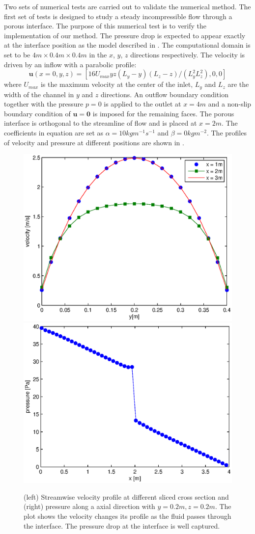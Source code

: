 Two sets of numerical tests are carried out to validate the numerical method.
The first set of tests is designed to study a steady incompressible flow
through a porous interface. The purpose of this numerical test is to verify the
implementation of our method. The pressure drop is expected to appear exactly
at the interface position as the model described in .  The
computational domain is set to be $4m\times 0.4m\times 0.4m$ in the $x$, $y$,
$z$ directions respectively. The velocity is driven by an inflow with a
parabolic profile:
\begin{equation}
\mathbf{u}(x=0,y,z) = [16U_{max}yz(L_y - y)(L_z - z)/(L^2_yL^2_z),0,0]
\end{equation}
where $U_{max}$ is the maximum velocity at the center of the inlet, $L_y$ and
$L_z$ are the width of the channel in $y$ and $z$ directions.  An outflow
boundary condition together with the pressure $p = 0$ is applied to the outlet
at $x = 4m$ and a non-slip boundary condition of $\mathbf{u} = \mathbf{0}$ is
imposed for the remaining faces. The porous interface is orthogonal to the
streamline of flow and is placed at $x = 2m$. The coefficients in equation
 are set as $\alpha = 10 kgm^{-1}s^{-1}$ and $\beta = 0kgm^{-2}$.
The profiles of velocity and pressure at different positions are shown in
.

\begin{figure}[h] \centering
\includegraphics[width=0.49\columnwidth]{Figures/ucrs_profile}
\includegraphics[width=0.49\columnwidth]{Figures/p_profile} \caption{(left)
Streamwise velocity profile at different sliced cross section and
(right) pressure along a axial direction with $y = 0.2m, z = 0.2m$. The plot
shows the velocity changes its profile as the fluid passes through the interface.
The pressure drop at the interface is well captured.}
\label{fig:test1_profile}
\end{figure}

